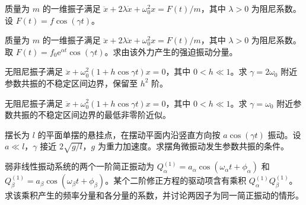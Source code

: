 \newpage
\noindent\begin{minipage}{\textwidth}
质量为 $m$ 的一维振子满足 $\ddot{x}+2\lambda\dot{x}+\omega_0^2x=F(t)/m$，其中 $\lambda>0$ 为阻尼系数。设 $F(t)=f\cos(\gamma t)$。
\end{minipage}\par\vfill
\noindent\begin{minipage}{\textwidth}
质量为 $m$ 的一维振子满足 $\ddot{x}+2\lambda\dot{x}+\omega_0^2x=F(t)/m$，其中 $\lambda>0$ 为阻尼系数。取 $F(t)=f_0\mathrm{e}^{\alpha t}\cos(\gamma t)$。求由该外力产生的强迫振动分量。
\end{minipage}\par\vfill
\newpage
\noindent\begin{minipage}{\textwidth}
无阻尼振子满足 $\ddot{x}+\omega_0^2(1+h\cos\gamma t)x=0$，其中 $0<h\ll1$。求 $\gamma=2\omega_0$ 附近参数共振的不稳定区间边界，保留至 $h^2$ 阶。
\end{minipage}\par\vfill
\noindent\begin{minipage}{\textwidth}
无阻尼振子满足 $\ddot{x}+\omega_0^2(1+h\cos\gamma t)x=0$，其中 $0<h\ll1$。求 $\gamma=\omega_0$ 附近参数共振的不稳定区间边界的最低非零阶近似。
\end{minipage}\par\vfill
\newpage
\noindent\begin{minipage}{\textwidth}
摆长为 $l$ 的平面单摆的悬挂点，在摆动平面内沿竖直方向按 $a\cos(\gamma t)$ 振动。设 $a\ll l$，$\gamma$ 接近 $2\sqrt{g/l}$，$g$ 为重力加速度。求摆角微振动发生参数共振的条件。
\end{minipage}\par\vfill
\noindent\begin{minipage}{\textwidth}
弱非线性振动系统的两个一阶简正振动为 $Q_\alpha^{(1)}=a_\alpha\cos(\omega_\alpha t+\phi_\alpha)$ 和 $Q_\beta^{(1)}=a_\beta\cos(\omega_\beta t+\phi_\beta)$。某个二阶修正方程的驱动项含有乘积 $Q_\alpha^{(1)}Q_\beta^{(1)}$。求该乘积产生的频率分量和各分量的系数，并讨论两因子为同一简正振动的情形。
\end{minipage}\par\vfill
\newpage
